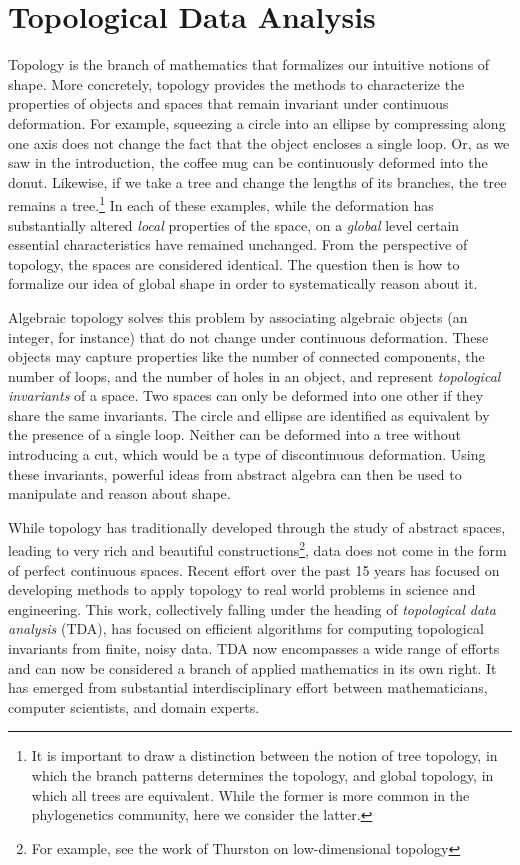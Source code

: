 \section{Topological Data Analysis}
\label{bg:tda}

Topology is the branch of mathematics that formalizes our intuitive notions of shape.
More concretely, topology provides the methods to characterize the properties of objects and spaces that remain invariant under continuous deformation.
For example, squeezing a circle into an ellipse by compressing along one axis does not change the fact that the object encloses a single loop.
Or, as we saw in the introduction, the coffee mug can be continuously deformed into the donut.
Likewise, if we take a tree and change the lengths of its branches, the tree remains a tree.\footnote{It is important to draw a distinction between the notion of tree topology, in which the branch patterns determines the topology, and global topology, in which all trees are equivalent. While the former is more common in the phylogenetics community, here we consider the latter.}
In each of these examples, while the deformation has substantially altered \emph{local} properties of the space, on a \emph{global} level certain essential characteristics have remained unchanged.
From the perspective of topology, the spaces are considered identical.
The question then is how to formalize our idea of global shape in order to systematically reason about it.

Algebraic topology solves this problem by associating algebraic objects (an integer, for instance) that do not change under continuous deformation.
These objects may capture properties like the number of connected components, the number of loops, and the number of holes in an object, and represent \emph{topological invariants} of a space.
Two spaces can only be deformed into one other if they share the same invariants.
The circle and ellipse are identified as equivalent by the presence of a single loop.
Neither can be deformed into a tree without introducing a cut, which would be a type of discontinuous deformation.
Using these invariants, powerful ideas from abstract algebra can then be used to manipulate and reason about shape.

While topology has traditionally developed through the study of abstract spaces, leading to very rich and beautiful constructions\footnote{For example, see the work of Thurston on low-dimensional topology}, data does not come in the form of perfect continuous spaces.
Recent effort over the past 15 years has focused on developing methods to apply topology to real world problems in science and engineering.
This work, collectively falling under the heading of \emph{topological data analysis} (TDA), has focused on efficient algorithms for computing topological invariants from finite, noisy data.
TDA now encompasses a wide range of efforts and can now be considered a branch of applied mathematics in its own right.
It has emerged from substantial interdisciplinary effort between mathematicians, computer scientists, and domain experts.

